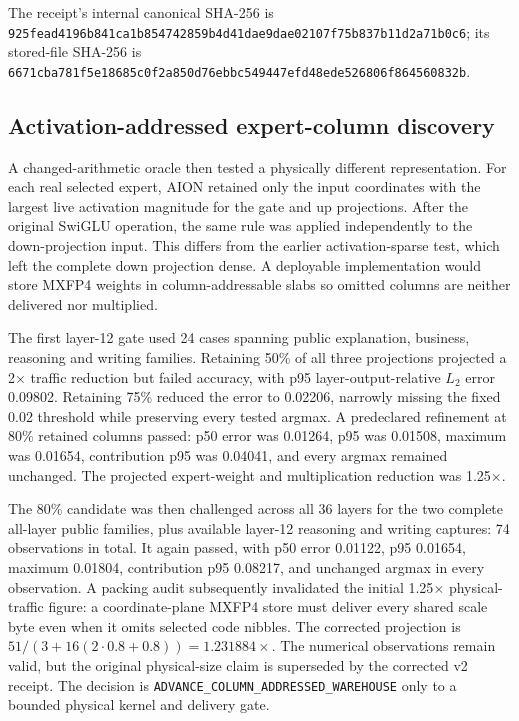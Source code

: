 The receipt's internal canonical SHA-256 is
\texttt{925fead4196b841ca1b854742859b4d41dae9dae02107f75b837b11d2a71b0c6};
its stored-file SHA-256 is
\texttt{6671cba781f5e18685c0f2a850d76ebbc549447efd48ede526806f864560832b}.

\subsection{Activation-addressed expert-column discovery}

A changed-arithmetic oracle then tested a physically different representation.
For each real selected expert, AION retained only the input coordinates with
the largest live activation magnitude for the gate and up projections.  After
the original SwiGLU operation, the same rule was applied independently to the
down-projection input.  This differs from the earlier activation-sparse test,
which left the complete down projection dense.  A deployable implementation
would store MXFP4 weights in column-addressable slabs so omitted columns are
neither delivered nor multiplied.

The first layer-12 gate used 24 cases spanning public explanation, business,
reasoning and writing families.  Retaining 50\% of all three projections
projected a 2$\times$ traffic reduction but failed accuracy, with p95
layer-output-relative $L_2$ error 0.09802.  Retaining 75\% reduced the error to
0.02206, narrowly missing the fixed 0.02 threshold while preserving every
tested argmax.  A predeclared refinement at 80\% retained columns passed:
p50 error was 0.01264, p95 was 0.01508, maximum was 0.01654, contribution p95
was 0.04041, and every argmax remained unchanged.  The projected expert-weight
and multiplication reduction was 1.25$\times$.

The 80\% candidate was then challenged across all 36 layers for the two
complete all-layer public families, plus available layer-12 reasoning and
writing captures: 74 observations in total.  It again passed, with p50 error
0.01122, p95 0.01654, maximum 0.01804, contribution p95 0.08217, and unchanged
argmax in every observation.  A packing audit subsequently invalidated the
initial 1.25$\times$ physical-traffic figure: a coordinate-plane MXFP4 store
must deliver every shared scale byte even when it omits selected code nibbles.
The corrected projection is
$51/(3+16(2\cdot0.8+0.8))=1.231884\times$.  The numerical observations remain
valid, but the original physical-size claim is superseded by the corrected
v2 receipt.  The decision is
\texttt{ADVANCE\_COLUMN\_ADDRESSED\_WAREHOUSE} only to a bounded physical
kernel and delivery gate.

